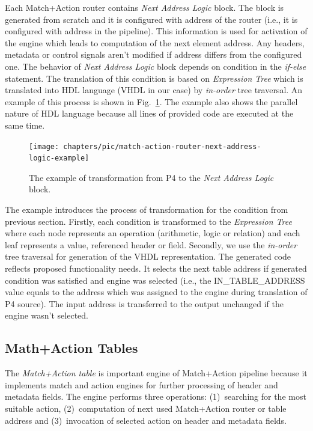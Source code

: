 Each Match+Action router contains \textit{Next Address Logic} block. The block is generated from scratch and it is configured with address of the 
router (i.e., it is configured with address in the pipeline).
This information is used for activation of the engine which leads to computation of the next element address. 
Any headers, metadata or control signals aren't modified if address 
differs from the configured one. The behavior of \textit{Next Address Logic} block depends on condition in the \textit{if-else} statement.
The translation of this condition is based on \textit{Expression Tree} which is translated into HDL language (VHDL in our case) by 
\textit{in-order} tree traversal. An example of this process is shown in Fig.~\ref{fig:matchActionRouterNextAddressExample}. 
The example also shows the parallel nature of HDL language because all lines of provided code are executed at the same time.

\begin{figure}[ht]
    \centering
    \texttt{[image: chapters/pic/match-action-router-next-address-logic-example]}
    \caption{The example of transformation from P4 to the \textit{Next Address Logic} block.}
    \label{fig:matchActionRouterNextAddressExample}
\end{figure}

The example introduces the process of transformation for the condition from previous section. Firstly, each condition is transformed 
to the \textit{Expression Tree} where each node represents an operation (arithmetic, logic or relation) and each leaf represents a value, 
referenced header or field. 
Secondly, we use the \textit{in-order} tree traversal for generation of the VHDL representation. 
The generated code reflects proposed functionality needs.
It selects the next table address if generated condition was satisfied and engine was selected 
(i.e., the IN\_TABLE\_ADDRESS value equals to the address which was assigned to the engine during translation of P4 source). 
The input address is transferred to the output unchanged if the engine wasn't selected.

\subsection{Math+Action Tables}
\label{sec:matchActionTables}
The \textit{Match+Action table} is important engine of Match+Action pipeline because it implements match and action engines for further processing of header
and metadata fields. The engine performs three operations: (1)~searching for the most suitable action, (2)~computation of next used
Match+Action router or table address and (3)~invocation of selected action on header and metadata fields. 


